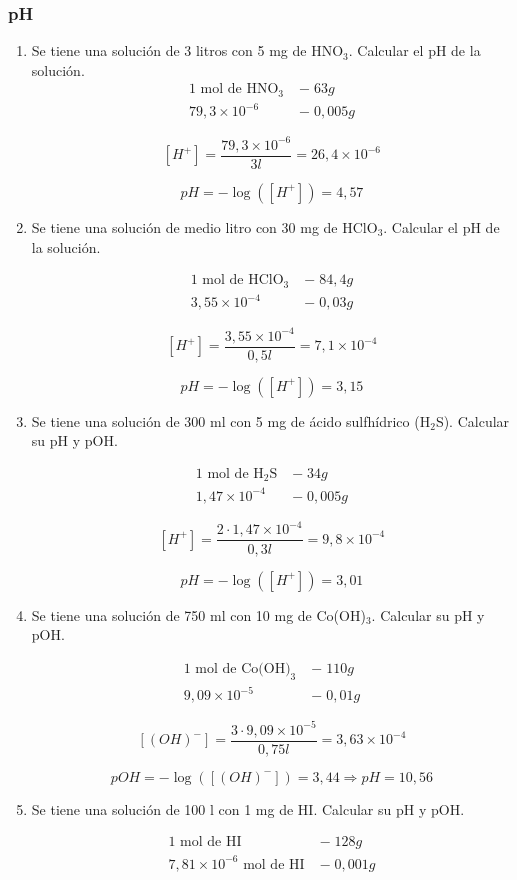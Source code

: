 \subsubsection*{pH}

\begin{enumerate}
\item Se tiene una solución de 3 litros con 5 mg de HNO$_3$. 
Calcular el pH de la solución.
\begin{align*}
\text{1 mol de HNO}_3 \;&-\; 63 g\\
 79,3\times 10^{-6} \;&-\; 0,005g
\end{align*}

$$[H^+] =  \dfrac{79,3\times 10^{-6}}{3l} = 26,4 \times 10^{-6}$$

$$pH=-\log([H^+]) = 4,57$$

\item Se tiene una solución de medio litro con 30 mg de HClO$_3$. Calcular el pH de la solución.

\begin{align*}
\text{1 mol de HClO}_3 \;&-\; 84,4 g\\
 3,55\times 10^{-4} \;&-\; 0,03g
\end{align*}

$$[H^+] =  \dfrac{3,55\times 10^{-4}}{0,5l} = 
7,1 \times 10^{-4}$$

$$pH=-\log([H^+]) = 3,15$$

\skipline
\item Se tiene una solución de 300 ml con 5 mg de ácido sulfhídrico (H$_2$S). Calcular su pH y pOH.

\begin{align*}
\text{1 mol de H}_2\text{S} \;&-\; 34 g\\
 1,47\times 10^{-4} \;&-\; 0,005g
\end{align*}

\skipline

$$[H^+] =  \dfrac{ 2\cdot 1,47\times 10^{-4}}{0,3l} = 
9,8 \times 10^{-4}$$

$$pH=-\log([H^+]) = 3,01$$

\skipline
\item Se tiene una solución de 750 ml con 10 mg de Co(OH)$_3$. Calcular su pH y pOH.

\begin{align*}
\text{1 mol de Co(OH)}_3 \;&-\; 110 g\\
 9,09\times 10^{-5} \;&-\; 0,01g
\end{align*}

\skipline

$$[(OH)^-] =  \dfrac{ 3\cdot  9,09\times 10^{-5}}{0,75l} = 
3,63 \times 10^{-4}$$

$$pOH=-\log([(OH)^-]) = 3,44
\Rightarrow pH = 10,56$$

\skipline
\item Se tiene una solución de 100 l con 1 mg de HI. Calcular su pH y pOH.

\begin{align*}
\text{1 mol de HI} \;&-\; 128 g\\
 7,81\times 10^{-6} \text{ mol de HI} \;&-\; 0,001g
\end{align*}
\end{enumerate}
